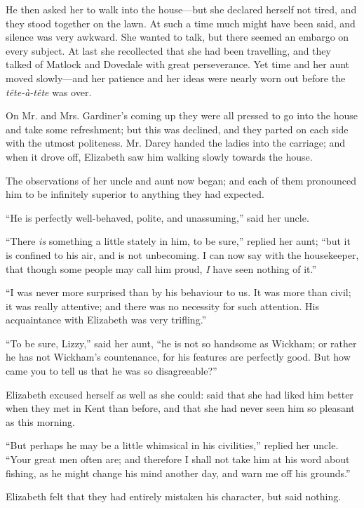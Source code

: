 \documentclass[12pt,openright]{book}
\begin{document}
He then asked her to walk into the house—but she declared herself not tired, and they stood together on the lawn. At such a time much might have been said, and silence was very awkward. She wanted to talk, but there seemed an embargo on every subject. At last she recollected that she had been travelling, and they talked of Matlock and Dovedale with great perseverance. Yet time and her aunt moved slowly—and her patience and her ideas were nearly worn out before the \textit{tête-à-tête} was over.

On Mr. and Mrs. Gardiner’s coming up they were all pressed to go into the house and take some refreshment; but this was declined, and they parted on each side with the utmost politeness. Mr. Darcy handed the ladies into the carriage; and when it drove off, Elizabeth saw him walking slowly towards the house.

The observations of her uncle and aunt now began; and each of them pronounced him to be infinitely superior to anything they had expected.

“He is perfectly well-behaved, polite, and unassuming,” said her uncle.

“There \textit{is} something a little stately in him, to be sure,” replied her aunt; “but it is confined to his air, and is not unbecoming. I can now say with the housekeeper, that though some people may call him proud, \textit{I} have seen nothing of it.”

“I was never more surprised than by his behaviour to us. It was more than civil; it was really attentive; and there was no necessity for such attention. His acquaintance with Elizabeth was very trifling.”

“To be sure, Lizzy,” said her aunt, “he is not so handsome as Wickham; or rather he has not Wickham’s countenance, for his features are perfectly good. But how came you to tell us that he was so disagreeable?”

Elizabeth excused herself as well as she could: said that she had liked him better when they met in Kent than before, and that she had never seen him so pleasant as this morning.

“But perhaps he may be a little whimsical in his civilities,” replied her uncle. “Your great men often are; and therefore I shall not take him at his word about fishing, as he might change his mind another day, and warn me off his grounds.”

Elizabeth felt that they had entirely mistaken his character, but said nothing.
\end{document}
